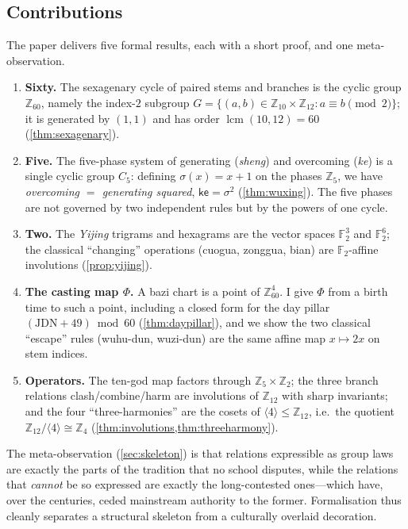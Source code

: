 \documentclass[11pt,a4paper]{article}
\theoremstyle{definition}
\theoremstyle{remark}
\DeclareMathOperator{\lcm}{lcm}
\newcommand{\Z}{\mathbb{Z}}
\newcommand{\F}{\mathbb{F}}
\newcommand{\ke}{\mathsf{ke}}
\begin{document}
\subsection{Contributions}
The paper delivers five formal results, each with a short proof, and one meta-observation.
\begin{enumerate}[leftmargin=*]
  \item \textbf{Sixty.} The sexagenary cycle of paired stems and branches is the cyclic group $\Z_{60}$, namely the index-$2$ subgroup $G=\{(a,b)\in\Z_{10}\times\Z_{12}:a\equiv b\pmod 2\}$; it is generated by $(1,1)$ and has order $\lcm(10,12)=60$ (\cref{thm:sexagenary}).
  \item \textbf{Five.} The five-phase system of generating (\emph{sheng}) and overcoming (\emph{ke}) is a single cyclic group $C_5$: defining $\sigma(x)=x+1$ on the phases $\Z_5$, we have \emph{overcoming $=$ generating squared}, $\ke=\sigma^2$ (\cref{thm:wuxing}). The five phases are not governed by two independent rules but by the powers of one cycle.
  \item \textbf{Two.} The \emph{Yijing} trigrams and hexagrams are the vector spaces $\F_2^3$ and $\F_2^6$; the classical ``changing'' operations (cuogua, zonggua, bian) are $\F_2$-affine involutions (\cref{prop:yijing}).
  \item \textbf{The casting map $\Phi$.} A bazi chart is a point of $\Z_{60}^4$. I give $\Phi$ from a birth time to such a point, including a closed form for the day pillar $(\mathrm{JDN}+49)\bmod 60$ (\cref{thm:daypillar}), and we show the two classical ``escape'' rules (wuhu-dun, wuzi-dun) are the same affine map $x\mapsto 2x$ on stem indices.
  \item \textbf{Operators.} The ten-god map factors through $\Z_5\times\Z_2$; the three branch relations clash/combine/harm are involutions of $\Z_{12}$ with sharp invariants; and the four ``three-harmonies'' are the cosets of $\langle 4\rangle\le\Z_{12}$, i.e.\ the quotient $\Z_{12}/\langle 4\rangle\cong\Z_4$ (\cref{thm:involutions,thm:threeharmony}).
\end{enumerate}
The meta-observation (\cref{sec:skeleton}) is that relations expressible as group laws are exactly the parts of the tradition that no school disputes, while the relations that \emph{cannot} be so expressed are exactly the long-contested ones---which have, over the centuries, ceded mainstream authority to the former. Formalisation thus cleanly separates a structural skeleton from a culturally overlaid decoration.
\end{document}
